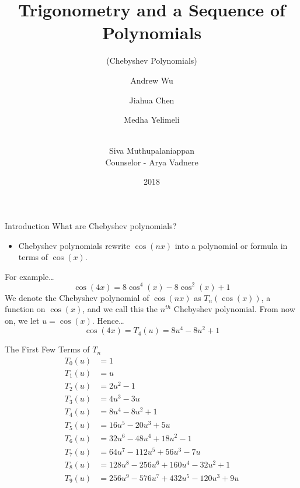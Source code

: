 \documentclass{beamer}
\title{Trigonometry and a Sequence of Polynomials}
\subtitle{(Chebyshev Polynomials)}
\author{
Andrew Wu\and Jiahua Chen\and Medha Yelimeli\and \\
Siva Muthupalaniappan
\\[12pt] Counselor - Arya Vadnere}
\institute{PROMYS}
\date{2018}
\begin{document}
\frame{\titlepage}

\begin{frame}{Introduction}
 What are Chebyshev polynomials?
 \begin{itemize}
  \item Chebyshev polynomials rewrite $\cos{(nx)}$ into a polynomial or formula in terms of $\cos{(x)}$.
 \end{itemize}
 For example\dots
 \[\cos{(4x)} = 8\cos^4{(x)} - 8 \cos^2{(x)} + 1\]
 We denote the Chebyshev polynomial of $\cos{(nx)}$ as $T_n(\cos{(x)})$, a function on $\cos{(x)}$, and we call this the $n^{th}$ Chebyshev polynomial. From now on, we let $u=\cos{(x)}$. Hence\dots
 \[\cos{(4x)} = T_4(u) = 8u^4 - 8 u^2 + 1\]
\end{frame}

\begin{frame}{The First Few Terms of $T_n$}
 \vspace{-24pt}
 \begin{align*}
  T_0(u) & = 1                                      \\
  T_1(u) & = u                                      \\
  T_2(u) & = 2u^2 - 1                               \\
  T_3(u) & = 4u^3 - 3u                              \\
  T_4(u) & = 8u^4 - 8 u^2 + 1                       \\
  T_5(u) & = 16u^5 - 20u^3 + 5u                     \\
  T_6(u) & = 32u^6 - 48u^4 + 18u^2 - 1              \\
  T_7(u) & = 64u^7 - 112u^5 + 56u^3 - 7u            \\
  T_8(u) & = 128u^8 - 256u^6 + 160u^4 - 32u^2 + 1   \\
  T_9(u) & = 256u^9 - 576u^7 + 432u^5 - 120u^3 + 9u
 \end{align*}
\end{frame}
\end{document}
